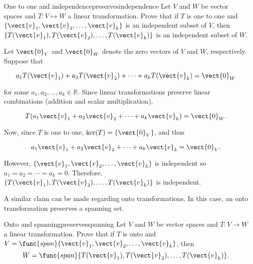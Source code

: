 \begin{example}{One to one and independence}{preservesindependence}
Let $V$ and $W$ be vector spaces and $T: V \mapsto W$ a linear
transformation.
Prove that if $T$ is one to one and
$\{\vect{v}_1, \vect{v}_2, \ldots, \vect{v}_k\}$ is an independent
subset of $V$, then
$\{T(\vect{v}_1), T(\vect{v}_2), \ldots, T(\vect{v}_k)\}$ is an independent
subset of $W$.
\end{example}

\begin{solution}
Let $\vect{0}_V$ and $\vect{0}_W$ denote the zero vectors of $V$ and $W$,
respectively.
Suppose that 

\[ a_1T(\vect{v}_1) + a_2T(\vect{v}_2) +\cdots +a_kT(\vect{v}_k) =\vect{0}_W \]

for some $a_1, a_2, \ldots, a_k\in\mathbb{R}$.
Since linear transformations preserve linear combinations (addition
and scalar multiplication),

\[ T(a_1\vect{v}_1 + a_2\vect{v}_2 +\cdots +a_k\vect{v}_k) =\vect{0}_W. \]

Now, since $T$ is one to one, $\ker(T)=\{\vect{0}_V\}$, and thus

\[ a_1\vect{v}_1 + a_2\vect{v}_2 +\cdots +a_k\vect{v}_k =\vect{0}_V. \]

\noindent However, $\{\vect{v}_1, \vect{v}_2, \ldots, \vect{v}_k\}$ is independent so $a_1=a_2=\cdots=a_k=0$.
Therefore, $\{T(\vect{v}_1), T(\vect{v}_2), \ldots, T(\vect{v}_k)\}$
is independent.
\end{solution}

A similar claim can be made regarding onto transformations. In this case, an onto transformation preserves a spanning set.

\begin{example}{Onto and spanning}{preservesspanning}
Let $V$ and $W$ be vector spaces and $T:V\to W$ a linear
transformation.
Prove that if $T$ is onto and
$V=\func{span}\{\vect{v}_1, \vect{v}_2, \ldots, \vect{v}_k\}$,
then
\[ W=\func{span}\{T(\vect{v}_1), T(\vect{v}_2), \ldots, T(\vect{v}_k)\}.\]
\end{example}

